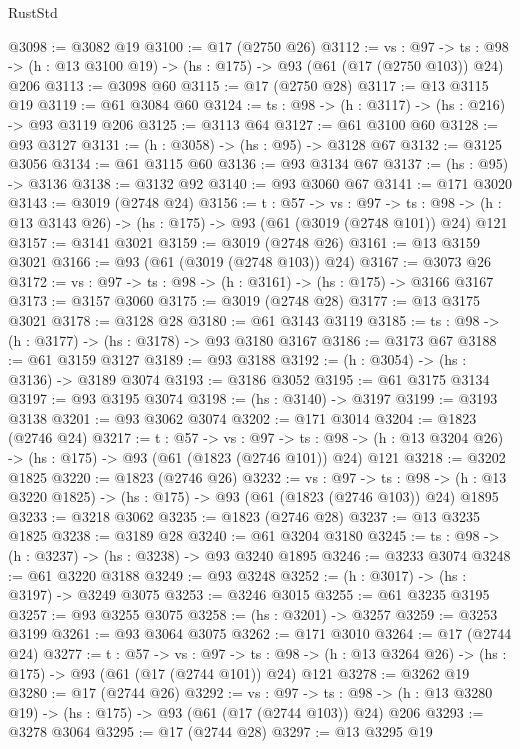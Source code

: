 \begin{lexlean}{RustStd}
\begin{coremodule}
@3098 := @3082 @19
@3100 := @17 (@2750 @26)
@3112 := {vs : @97} ->
  {ts : @98} -> (h : @13 @3100 @19) -> (hs : @175) -> @93 (@61 (@17 (@2750 @103)) @24) @206
@3113 := @3098 @60
@3115 := @17 (@2750 @28)
@3117 := @13 @3115 @19
@3119 := @61 @3084 @60
@3124 := {ts : @98} -> (h : @3117) -> (hs : @216) -> @93 @3119 @206
@3125 := @3113 @64
@3127 := @61 @3100 @60
@3128 := @93 @3127
@3131 := (h : @3058) -> (hs : @95) -> @3128 @67
@3132 := @3125 @3056
@3134 := @61 @3115 @60
@3136 := @93 @3134 @67
@3137 := (hs : @95) -> @3136
@3138 := @3132 @92
@3140 := @93 @3060 @67
@3141 := @171 @3020
@3143 := @3019 (@2748 @24)
@3156 := {t : @57} ->
  {vs : @97} ->
  {ts : @98} -> (h : @13 @3143 @26) -> (hs : @175) -> @93 (@61 (@3019 (@2748 @101)) @24) @121
@3157 := @3141 @3021
@3159 := @3019 (@2748 @26)
@3161 := @13 @3159 @3021
@3166 := @93 (@61 (@3019 (@2748 @103)) @24)
@3167 := @3073 @26
@3172 := {vs : @97} -> {ts : @98} -> (h : @3161) -> (hs : @175) -> @3166 @3167
@3173 := @3157 @3060
@3175 := @3019 (@2748 @28)
@3177 := @13 @3175 @3021
@3178 := @3128 @28
@3180 := @61 @3143 @3119
@3185 := {ts : @98} -> (h : @3177) -> (hs : @3178) -> @93 @3180 @3167
@3186 := @3173 @67
@3188 := @61 @3159 @3127
@3189 := @93 @3188
@3192 := (h : @3054) -> (hs : @3136) -> @3189 @3074
@3193 := @3186 @3052
@3195 := @61 @3175 @3134
@3197 := @93 @3195 @3074
@3198 := (hs : @3140) -> @3197
@3199 := @3193 @3138
@3201 := @93 @3062 @3074
@3202 := @171 @3014
@3204 := @1823 (@2746 @24)
@3217 := {t : @57} ->
  {vs : @97} ->
  {ts : @98} -> (h : @13 @3204 @26) -> (hs : @175) -> @93 (@61 (@1823 (@2746 @101)) @24) @121
@3218 := @3202 @1825
@3220 := @1823 (@2746 @26)
@3232 := {vs : @97} ->
  {ts : @98} -> (h : @13 @3220 @1825) -> (hs : @175) -> @93 (@61 (@1823 (@2746 @103)) @24) @1895
@3233 := @3218 @3062
@3235 := @1823 (@2746 @28)
@3237 := @13 @3235 @1825
@3238 := @3189 @28
@3240 := @61 @3204 @3180
@3245 := {ts : @98} -> (h : @3237) -> (hs : @3238) -> @93 @3240 @1895
@3246 := @3233 @3074
@3248 := @61 @3220 @3188
@3249 := @93 @3248
@3252 := (h : @3017) -> (hs : @3197) -> @3249 @3075
@3253 := @3246 @3015
@3255 := @61 @3235 @3195
@3257 := @93 @3255 @3075
@3258 := (hs : @3201) -> @3257
@3259 := @3253 @3199
@3261 := @93 @3064 @3075
@3262 := @171 @3010
@3264 := @17 (@2744 @24)
@3277 := {t : @57} ->
  {vs : @97} ->
  {ts : @98} -> (h : @13 @3264 @26) -> (hs : @175) -> @93 (@61 (@17 (@2744 @101)) @24) @121
@3278 := @3262 @19
@3280 := @17 (@2744 @26)
@3292 := {vs : @97} ->
  {ts : @98} -> (h : @13 @3280 @19) -> (hs : @175) -> @93 (@61 (@17 (@2744 @103)) @24) @206
@3293 := @3278 @3064
@3295 := @17 (@2744 @28)
@3297 := @13 @3295 @19

\end{coremodule}
\end{lexlean}
